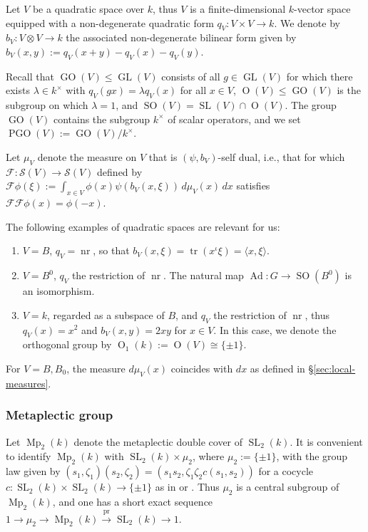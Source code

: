 \documentclass[reqno,10pt]{amsart}
\theoremstyle{plain} %
\theoremstyle{definition}
\theoremstyle{plain} %
\theoremstyle{remark}
\theoremstyle{itplain} %
\theoremstyle{remark} %
\renewcommand{\leq}{\leqslant}
\numberwithin{equation}{section}
\DeclareMathOperator{\SL}{SL}
\DeclareMathOperator{\Mp}{Mp}
\DeclareMathOperator{\GL}{GL}
\DeclareMathOperator{\GO}{GO}
\DeclareMathOperator{\PGO}{PGO}
\DeclareMathOperator{\SO}{SO}
\DeclareMathOperator{\Ad}{Ad}
\def\O{\operatorname{O}}
\DeclareMathOperator{\pr}{pr}
\DeclareMathOperator{\nr}{nr}
\DeclareMathOperator{\tr}{tr}
\begin{document}
Let $V$ be a quadratic space over $k$, thus $V$ is a finite-dimensional $k$-vector space equipped with a non-degenerate quadratic form $q_V : V \times V \rightarrow k$.  We denote by $b_V : V \otimes V \rightarrow k$ the associated non-degenerate bilinear form given by $b_V(x,y) := q_V(x+y) - q_V(x) - q_V(y)$.

Recall that $\GO(V) \leq \GL(V)$ consists of all $g \in \GL(V)$ for which there exists $\lambda \in k^\times$ with $q_V(g x) = \lambda q_V(x)$ for all $x \in V$, $\O(V) \leq \GO(V)$ is the subgroup on which $\lambda = 1$, and $\SO(V) = \SL(V) \cap \O(V)$.  The group $\GO(V)$ contains the subgroup $k^\times$ of scalar operators, and we set $\PGO(V) := \GO(V) / k^\times$.

Let $\mu_V$ denote the measure on $V$ that is $(\psi,b_V)$-self dual, i.e., that for which $\mathcal{F} : \mathcal{S}(V) \rightarrow \mathcal{S}(V)$ defined by $\mathcal{F} \phi(\xi) := \int_{x \in V} \phi(x) \psi(b_V(x,\xi)) \, d \mu_V(x) \,d x$ satisfies $\mathcal{F} \mathcal{F} \phi(x) = \phi(-x)$.


The following examples of quadratic spaces are relevant for us:
\begin{enumerate}
\item $V = B$, $q_V = \nr$, so that $b_V(x,\xi) = \tr(x^{\iota} \xi) = \langle x,\xi \rangle$.
\item $V = B^0$, $q_V$ the restriction of $\nr$.  The natural map $\Ad : G \rightarrow \SO(B^0)$
  is an isomorphism.
\item $V = k$, regarded as a subspace of $B$, and $q_V$ the restriction of $\nr$, thus $q_V(x) = x^2$ and $b_V(x,y) = 2 x y$ for $x \in V$.  In this case, we denote the orthogonal group by $\O_1(k) := \O(V) \cong \{\pm 1\}$.
\end{enumerate}
For $V = B, B_0$, the measure $d \mu_V(x)$ coincides with $d x$ as defined in \S\ref{sec:local-measures}.

\subsubsection{Metaplectic group}
\label{sec-2-2-2}
Let $\Mp_2(k)$ denote the metaplectic double cover of $\SL_2(k)$.  It is convenient to identify $\Mp_2(k)$ with $\SL_2(k) \times \mu_2$, where $\mu_2 := \{\pm 1\}$, with the group law given by $(s_1,\zeta_1) (s_2,\zeta_2) = (s_1 s_2, \zeta_1 \zeta_2 c(s_1,s_2))$ for a cocycle $c : \SL_2(k) \times \SL_2(k) \rightarrow \{\pm 1\}$ as in \cite[p.19]{MR0424695} or \cite[\S4.4]{nelson-theta-squared}.
Thus $\mu_2$ is a central subgroup of $\Mp_2(k)$, and one has a short exact sequence $1 \rightarrow \mu_2 \rightarrow \Mp_2(k) \xrightarrow{\pr} \SL_2(k) \rightarrow 1$.
\end{document}
